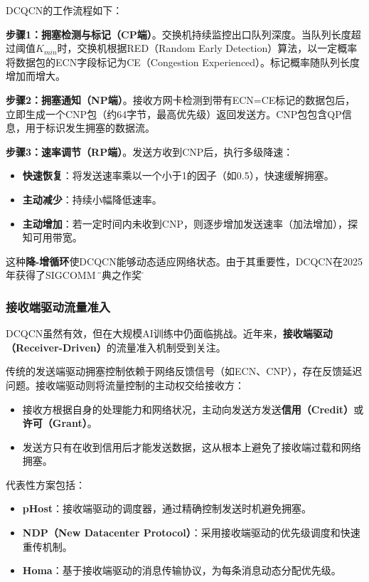 DCQCN的工作流程如下：

\textbf{步骤1：拥塞检测与标记（CP端）}。交换机持续监控出口队列深度。当队列长度超过阈值$K_{min}$时，交换机根据RED（Random Early Detection）算法，以一定概率将数据包的ECN字段标记为CE（Congestion Experienced）。标记概率随队列长度增加而增大。

\textbf{步骤2：拥塞通知（NP端）}。接收方网卡检测到带有ECN=CE标记的数据包后，立即生成一个CNP包（约64字节，最高优先级）返回发送方。CNP包包含QP信息，用于标识发生拥塞的数据流。

\textbf{步骤3：速率调节（RP端）}。发送方收到CNP后，执行多级降速：
\begin{itemize}
    \item \textbf{快速恢复}：将发送速率乘以一个小于1的因子（如0.5），快速缓解拥塞。
    \item \textbf{主动减少}：持续小幅降低速率。
    \item \textbf{主动增加}：若一定时间内未收到CNP，则逐步增加发送速率（加法增加），探知可用带宽。
\end{itemize}

这种\textbf{降-增循环}使DCQCN能够动态适应网络状态。由于其重要性，DCQCN在2025年获得了SIGCOMM \"经典之作奖\"。

\subsubsection{接收端驱动流量准入}

DCQCN虽然有效，但在大规模AI训练中仍面临挑战。近年来，\textbf{接收端驱动（Receiver-Driven）}的流量准入机制受到关注。

传统的发送端驱动拥塞控制依赖于网络反馈信号（如ECN、CNP），存在反馈延迟问题。接收端驱动则将流量控制的主动权交给接收方：

\begin{itemize}
    \item 接收方根据自身的处理能力和网络状况，主动向发送方发送\textbf{信用（Credit）}或\textbf{许可（Grant）}。
    \item 发送方只有在收到信用后才能发送数据，这从根本上避免了接收端过载和网络拥塞。
\end{itemize}

代表性方案包括：
\begin{itemize}
    \item \textbf{pHost}：接收端驱动的调度器，通过精确控制发送时机避免拥塞。
    \item \textbf{NDP（New Datacenter Protocol）}：采用接收端驱动的优先级调度和快速重传机制。
    \item \textbf{Homa}：基于接收端驱动的消息传输协议，为每条消息动态分配优先级。
\end{itemize}


